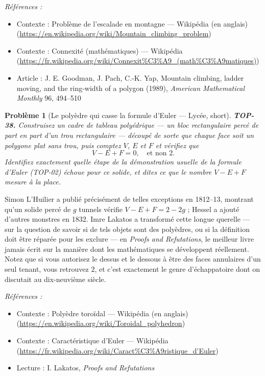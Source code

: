 \documentclass[11pt]{article}
\newtheorem{problem}{Problème}
\newenvironment{refs}{\par\small\noindent\emph{Références :}\begin{itemize}\setlength\itemsep{0pt}}{\end{itemize}\normalsize}
\begin{document}
\begin{refs}
\item Contexte : Problème de l'escalade en montagne --- Wikipédia (en anglais) (\url{https://en.wikipedia.org/wiki/Mountain_climbing_problem})
\item Contexte : Connexité (mathématiques) --- Wikipédia (\url{https://fr.wikipedia.org/wiki/Connexit%C3%A9_(math%C3%A9matiques)})
\item Article : J. E. Goodman, J. Pach, C.-K. Yap, \og{} Mountain climbing, ladder moving, and the ring-width of a polygon \fg{} (1989), \textit{American Mathematical Monthly} 96, 494--510
\end{refs}

\bigskip

\begin{problem}[{Le polyèdre qui casse la formule d'Euler --- Lycée, short}]
\textbf{TOP-38.} Construisez un cadre de tableau polyédrique --- un bloc
rectangulaire percé de part en part d'un trou rectangulaire --- découpé de sorte que chaque face soit un
polygone plat sans trou, puis comptez $ V $, $ E $ et $ F $ et vérifiez que
\[ V - E + F = 0 , \quad \text{et non } 2 . \]
Identifiez exactement quelle étape de la démonstration usuelle de la formule d'Euler (TOP-02) échoue
pour ce solide, et dites ce que le nombre $ V - E + F $ mesure à la place.
\end{problem}

\noindent Simon L'Huilier a publié précisément de telles exceptions en 1812--13, montrant qu'un
solide percé de $ g $ tunnels vérifie $ V - E + F = 2 - 2g $ ; Hessel a ajouté d'autres \og{} monstres \fg{}
en 1832. Imre Lakatos a transformé cette longue querelle --- sur la question de savoir si de tels objets
sont des polyèdres, ou si la définition doit être réparée pour les exclure --- en
\textit{Proofs and Refutations}, le meilleur livre jamais écrit sur la manière dont les mathématiques se
développent réellement. Notez que si vous autorisez le dessus et le dessous à être des faces annulaires
d'un seul tenant, vous retrouvez $ 2 $, et c'est exactement le genre d'échappatoire dont on discutait
au dix-neuvième siècle.

\begin{refs}
\item Contexte : Polyèdre toroïdal --- Wikipédia (en anglais) (\url{https://en.wikipedia.org/wiki/Toroidal_polyhedron})
\item Contexte : Caractéristique d'Euler --- Wikipédia (\url{https://fr.wikipedia.org/wiki/Caract%C3%A9ristique_d'Euler})
\item Lecture : I. Lakatos, \textit{Proofs and Refutations}
\end{refs}
\end{document}

